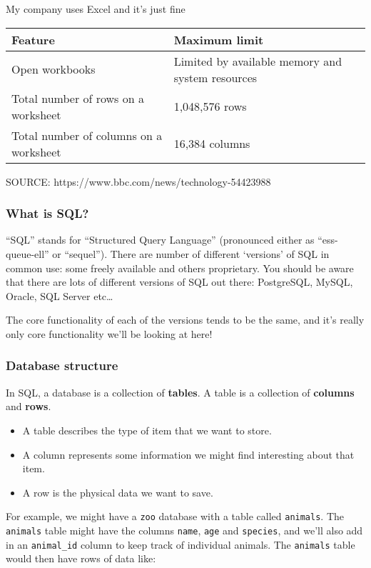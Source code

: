 \documentclass[11pt]{article}
\providecommand{\tightlist}{%
      \setlength{\itemsep}{0pt}\setlength{\parskip}{0pt}}
\begin{document}
My company uses Excel and it's just fine

\begin{longtable}[]{@{}ll@{}}
\toprule
Feature & Maximum limit\tabularnewline
\midrule
\endhead
Open workbooks & Limited by available memory and system
resources\tabularnewline
Total number of rows on a worksheet & 1,048,576 rows\tabularnewline
Total number of columns on a worksheet & 16,384 columns\tabularnewline
\bottomrule
\end{longtable}

SOURCE: https://www.bbc.com/news/technology-54423988

    \hypertarget{what-is-sql}{%
\subsubsection{What is SQL?}\label{what-is-sql}}

``SQL'' stands for ``Structured Query Language'' (pronounced either as
``ess-queue-ell'' or ``sequel''). There are number of different
`versions' of SQL in common use: some freely available and others
proprietary. You should be aware that there are lots of different
versions of SQL out there: PostgreSQL, MySQL, Oracle, SQL Server
etc\ldots{}

The core functionality of each of the versions tends to be the same, and
it's really only core functionality we'll be looking at here!

\hypertarget{database-structure}{%
\subsubsection{Database structure}\label{database-structure}}

In SQL, a database is a collection of \textbf{tables}. A table is a
collection of \textbf{columns} and \textbf{rows}.

\begin{itemize}
\tightlist
\item
  A table describes the type of item that we want to store.
\item
  A column represents some information we might find interesting about
  that item.
\item
  A row is the physical data we want to save.
\end{itemize}

For example, we might have a \texttt{zoo} database with a table called
\texttt{animals}. The \texttt{animals} table might have the columns
\texttt{name}, \texttt{age} and \texttt{species}, and we'll also add in
an \texttt{animal\_id} column to keep track of individual animals. The
\texttt{animals} table would then have rows of data like:
\end{document}
